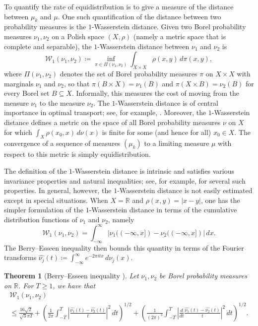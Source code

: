 \documentclass[11pt,a4paper]{amsart}
\newcommand{\R}{\mathbb{R}}
\newcommand{\Wscr}{\mathscr{W}}
\numberwithin{equation}{section}
\newtheorem{theorem}[equation]{Theorem}
\theoremstyle{remark}
\theoremstyle{definition}
\begin{document}
To quantify the rate of equidistribution is to give a measure of the distance between $\mu_k$ and $\mu$. One such quantification of the distance between two probability measures is the $1$-Wasserstein distance. Given two Borel probability measures $\nu_1,\nu_2$ on a Polish space $(X,\rho)$ (namely a metric space that is complete and separable), the $1$-Wasserstein distance between $\nu_1$ and $\nu_2$ is
\[\Wscr_1(\nu_1,\nu_2) \coloneqq \inf_{\pi \in \Pi(\nu_1,\nu_2)} \int_{X \times X} \rho(x,y) \, d\pi(x,y),\]
where $\Pi(\nu_1,\nu_2)$ denotes the set of Borel probability measures $\pi$ on $X \times X$ with marginals $\nu_1$ and $\nu_2$, so that $\pi(B \times X) = \nu_1(B)$ and $\pi(X \times B) = \nu_2(B)$ for every Borel set $B \subseteq X$. Informally, this measures the cost of moving from the measure $\nu_1$ to the measure $\nu_2$. The $1$-Wasserstein distance is of central importance in optimal transport; see, for example, \cite{Vil03}. Moreover, the $1$-Wasserstein distance defines a metric on the space of all Borel probability measures $\nu$ on $X$ for which $\int_{X} \rho(x_0,x) \, d\nu(x)$ is finite for some (and hence for all) $x_0 \in X$. The convergence of a sequence of measures $(\mu_k)$ to a limiting measure $\mu$ with respect to this metric is simply equidistribution.

The definition of the $1$-Wasserstein distance is intrinsic and satisfies various invariance properties and natural inequalities; see, for example, \cite[Theorem 1.2]{KU25} for several such properties. In general, however, the $1$-Wasserstein distance is not easily estimated except in special situations. When $X = \R$ and $\rho(x,y) = |x - y|$, one has the simpler formulation of the $1$-Wasserstein distance in terms of the cumulative distribution functions of $\nu_1$ and $\nu_2$, namely
\[\Wscr_1(\nu_1,\nu_2) = \int_{-\infty}^{\infty} |\nu_1((-\infty,x]) - \nu_2((-\infty,x])| \, dx.\]
The Berry--Esseen inequality then bounds this quantity in terms of the Fourier transforms $\widehat{\nu_j}(t) \coloneqq \int_{-\infty}^{\infty} e^{-2\pi itx} \, d\nu_j(x)$.

\begin{theorem}[{Berry--Esseen inequality \cite[Corollary 8.3]{Bob16}}]
Let $\nu_1,\nu_2$ be Borel probability measures on $\R$. For $T \geq 1$, we have that
\begin{multline*}
\Wscr_1(\nu_1,\nu_2)	\\
\leq \frac{16\sqrt{2}}{\sqrt{3}\pi T} + \left(\frac{1}{2\pi} \int_{-T}^{T} \left|\frac{\widehat{\nu_1}(t) - \widehat{\nu_2}(t)}{t}\right|^2 \, dt\right)^{1/2} + \left(\frac{1}{(2\pi)^3} \int_{-T}^{T} \left|\frac{d}{dt} \frac{\widehat{\nu_1}(t) - \widehat{\nu_2}(t)}{t}\right|^2 \, dt\right)^{1/2}.
\end{multline*}
\end{theorem}
\end{document}
